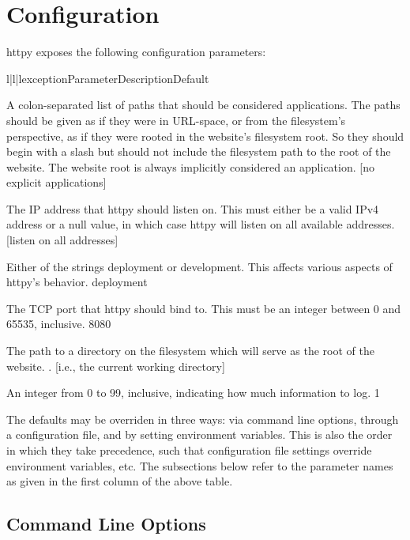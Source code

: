 \chapter{Configuration}

httpy exposes the following configuration parameters:


\begin{tableiii}{l|l|l}{exception}{Parameter}{Description}{Default}

    {A colon-separated list of paths that should be considered applications. The
    paths should be given as if they were in URL-space, or from the filesystem's
    perspective, as if they were rooted in the website's filesystem root. So
    they should begin with a slash but should not include the filesystem path to
    the root of the website. The website root is always implicitly considered an
    application.}
    {[no explicit applications]}

    {The IP address that httpy should listen on. This must either be a valid
    IPv4 address or a null value, in which case httpy will listen on all
    available addresses.}
    {[listen on all addresses]}

    {Either of the strings deployment or development. This affects various
    aspects of httpy's behavior.}
    {deployment}

    {The TCP port that httpy should bind to. This must be an integer between 0
    and 65535, inclusive.}
    {8080}

    {The path to a directory on the filesystem which will serve as the root of
    the website.}
    {. [i.e., the current working directory]}

    {An integer from 0 to 99, inclusive, indicating how much information to
    log.}
    {1}

\end{tableiii}

The defaults may be overriden in three ways: via command line options, through a
configuration file, and by setting environment variables. This is also the order
in which they take precedence, such that configuration file settings override
environment variables, etc. The subsections below refer to the parameter names
as given in the first column of the above table.




\section{Command Line Options}

